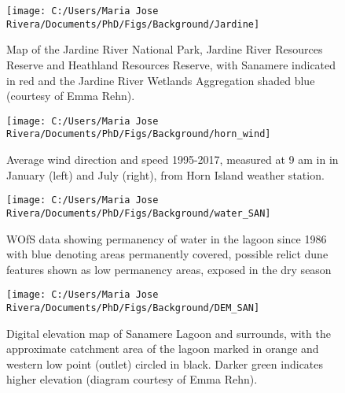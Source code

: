 \documentclass[
  12pt,
]{book}
\begin{document}
\begin{figure}

{\centering \texttt{[image: C:/Users/Maria Jose Rivera/Documents/PhD/Figs/Background/Jardine]} 

}

\caption{Map of the Jardine River National Park, Jardine River Resources Reserve and Heathland Resources Reserve, with Sanamere indicated in red and the Jardine River Wetlands Aggregation shaded blue (courtesy of Emma Rehn).}\label{fig:fig-jardine}
\end{figure}



\begin{figure}

{\centering \texttt{[image: C:/Users/Maria Jose Rivera/Documents/PhD/Figs/Background/horn\_wind]} 

}

\caption{Average wind direction and speed 1995-2017, measured at 9 am in in January (left) and July (right), from Horn Island weather station.}\label{fig:fig-wind-SAN}
\end{figure}



\begin{figure}

{\centering \texttt{[image: C:/Users/Maria Jose Rivera/Documents/PhD/Figs/Background/water\_SAN]} 

}

\caption{WOfS data showing permanency of water in the lagoon since 1986 with blue denoting areas permanently covered, possible relict dune features shown as low permanency areas, exposed in the dry season}\label{fig:fig-water-SAN}
\end{figure}



\begin{figure}

{\centering \texttt{[image: C:/Users/Maria Jose Rivera/Documents/PhD/Figs/Background/DEM\_SAN]} 

}

\caption{Digital elevation map of Sanamere Lagoon and surrounds, with the approximate catchment area of the lagoon marked in orange and western low point (outlet) circled in black. Darker green indicates higher elevation (diagram courtesy of Emma Rehn).}\label{fig:fig-DEM-SAN}
\end{figure}
\end{document}
